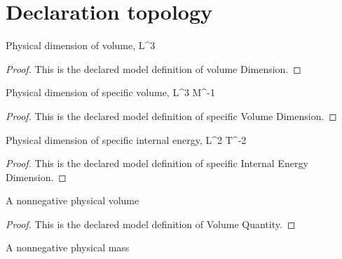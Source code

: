 \section{Declaration topology}
\begin{definition}
  \label{def:physics:phyx-mini-0462:phyxminiproblems-problemphyxmini0462-volumedimension}
  Physical dimension of volume, L\textasciicircum{}3
\end{definition}
\begin{proof}
  This is the declared model definition of volume Dimension.
\end{proof}
\begin{definition}
  \label{def:physics:phyx-mini-0462:phyxminiproblems-problemphyxmini0462-specificvolumedimension}
  Physical dimension of specific volume, L\textasciicircum{}3 M\textasciicircum{}-1
\end{definition}
\begin{proof}
  This is the declared model definition of specific Volume Dimension.
\end{proof}
\begin{definition}
  \label{def:physics:phyx-mini-0462:phyxminiproblems-problemphyxmini0462-specificinternalenergydimension}
  Physical dimension of specific internal energy, L\textasciicircum{}2 T\textasciicircum{}-2
\end{definition}
\begin{proof}
  This is the declared model definition of specific Internal Energy Dimension.
\end{proof}
\begin{definition}
  \label{def:physics:phyx-mini-0462:phyxminiproblems-problemphyxmini0462-volumequantity}
  A nonnegative physical volume
\end{definition}
\begin{proof}
  This is the declared model definition of Volume Quantity.
\end{proof}
\begin{definition}
  \label{def:physics:phyx-mini-0462:phyxminiproblems-problemphyxmini0462-massquantity}
  A nonnegative physical mass
\end{definition}
